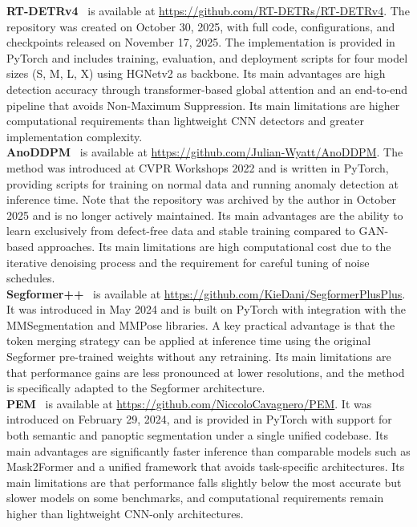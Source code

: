 \documentclass[11pt]{article}
\begin{document}
\textbf{RT-DETRv4}~\cite{LiaoRTDETRv4} is available at 
\url{https://github.com/RT-DETRs/RT-DETRv4}. The repository was created on 
October 30, 2025, with full code, configurations, and checkpoints released on 
November 17, 2025. The implementation is provided in PyTorch and includes training, 
evaluation, and deployment scripts for four model sizes (S, M, L, X) using HGNetv2 
as backbone. Its main advantages are high detection accuracy through transformer-based 
global attention and an end-to-end pipeline that avoids Non-Maximum Suppression. Its 
main limitations are higher computational requirements than lightweight CNN detectors 
and greater implementation complexity.\\

\textbf{AnoDDPM}~\cite{WyattAnoDDPM2022} is available at 
\url{https://github.com/Julian-Wyatt/AnoDDPM}. The method was introduced at CVPR 
Workshops 2022 and is written in PyTorch, providing scripts for training on normal 
data and running anomaly detection at inference time. Note that the repository was 
archived by the author in October 2025 and is no longer actively maintained. Its 
main advantages are the ability to learn exclusively from defect-free data and stable 
training compared to GAN-based approaches. Its main limitations are high computational 
cost due to the iterative denoising process and the requirement for careful tuning of 
noise schedules.\\

\textbf{Segformer++}~\cite{KienzleSegformer2024} is available at 
\url{https://github.com/KieDani/SegformerPlusPlus}. It was introduced in May 2024 
and is built on PyTorch with integration with the MMSegmentation and MMPose 
libraries. A key practical advantage is that the token merging strategy can be 
applied at inference time using the original Segformer pre-trained weights without 
any retraining. Its main limitations are that performance gains are less pronounced 
at lower resolutions, and the method is specifically adapted to the Segformer 
architecture.\\

\textbf{PEM}~\cite{CavagneroPEM2024} is available at 
\url{https://github.com/NiccoloCavagnero/PEM}. It was introduced on February 29, 
2024, and is provided in PyTorch with support for both semantic and panoptic 
segmentation under a single unified codebase. Its main advantages are significantly 
faster inference than comparable models such as Mask2Former and a unified framework 
that avoids task-specific architectures. Its main limitations are that performance 
falls slightly below the most accurate but slower models on some benchmarks, and 
computational requirements remain higher than lightweight CNN-only architectures.\\
\end{document}

